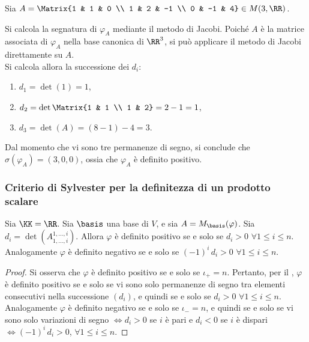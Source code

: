 \begin{example}
	Sia $A = \Matrix{1 & 1 & 0 \\ 1 & 2 & -1 \\ 0 & -1 & 4} \in M(3, \RR)$. \\
	
	\vskip 0.1in
	
	Si calcola la segnatura di $\varphi_A$ mediante
	il metodo di Jacobi. Poiché $A$ è la matrice associata di $\varphi_A$ nella base canonica di $\RR^3$,
	si può applicare il metodo di Jacobi direttamente su $A$. \\
	
	Si calcola allora la successione dei $d_i$:
	
	\begin{enumerate}
		\item $d_1 = \det(1) = 1$,
		\item $d_2 = \det\Matrix{1 & 1 \\ 1 & 2} = 2 - 1 = 1$,
		\item $d_3 = \det(A) = (8 - 1) - 4 = 3$.
	\end{enumerate}
	
	Dal momento che vi sono tre permanenze di segno, si conclude che $\sigma(\varphi_A) = (3, 0, 0)$, ossia
	che $\varphi_A$ è definito positivo.
\end{example}

\subsubsection{Criterio di Sylvester per la definitezza di un prodotto scalare}

\begin{proposition} Sia $\KK= \RR$.
	Sia $\basis$ una base di $V$, e sia $A = M_\basis(\varphi)$. Sia $d_i = \det\left(A^{1,\ldots,i}_{1,\ldots,i}\right)$.
	Allora $\varphi$ è definito positivo se e solo se $d_i > 0$ $\forall 1 \leq i \leq n$. Analogamente
	$\varphi$ è definito negativo se e solo se $(-1)^i \, d_i > 0$ $\forall 1 \leq i \leq n$. 
\end{proposition}

\begin{proof}
	Si osserva che $\varphi$ è definito positivo se e solo se $\iota_+ = n$. Pertanto, per il
	\textit{}, $\varphi$ è definito positivo se e solo se vi sono
	solo permanenze di segno tra elementi consecutivi nella successione $(d_i)$, e quindi
	se e solo se $d_i > 0$ $\forall 1 \leq i \leq n$. Analogamente $\varphi$ è definito
	negativo se e solo se $\iota_- = n$, e quindi se e solo se vi sono solo variazioni
	di segno $\iff d_i > 0$ se $i$ è pari e $d_i < 0$ se $i$ è dispari $\iff (-1)^i \, d_i > 0$, $\forall 1 \leq i \leq n$.
\end{proof}

